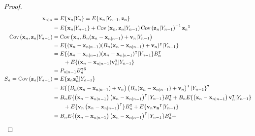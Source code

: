 \begin{proof}
    \begin{align}
        \mathbf{x}_{n|n}&=E\{\mathbf{x}_n|Y_n\}=E\{\mathbf{x}_n|Y_{n-1},\mathbf{z}_n\}\nonumber\\
                        &=E\{\mathbf{x}_n|Y_{n-1}\}+\text{Cov}\left(\mathbf{x}_n,\mathbf{z}_n|Y_{n-1}\right)\text{Cov}\left(\mathbf{z}_n|Y_{n-1}\right)^{-1}\mathbf{z}_n\footnotemark[5]\label{eq:xtGtTmp}\\
        \text{Cov}\left(\mathbf{x}_n,\mathbf{z}_n|Y_{n-1}\right)&=\text{Cov}\left(\mathbf{x}_n,B_n(\mathbf{x}_n-\mathbf{x}_{n|n-1})+\mathbf{v}_n|Y_{n-1}\right)\nonumber\\
                                                                &=E\{(\mathbf{x}_n-\mathbf{x}_{n|n-1})(B_n(\mathbf{x}_n-\mathbf{x}_{n|n-1})+\mathbf{v}_n)^\intercal|Y_{n-1}\}\nonumber\\
                                                                &=E\{(\mathbf{x}_n-\mathbf{x}_{n|n-1})(\mathbf{x}_n-\mathbf{x}_{n|n-1})^\intercal|Y_{n-1}\}B_n^\intercal\nonumber\\
                                                                &\qquad +E\{(\mathbf{x}_n-\mathbf{x}_{n|n-1})\mathbf{v}_n^\intercal|Y_{n-1}\}\nonumber\\
                                                                &=P_{n|n-1}B_n^\intercal\footnotemark[6]\label{eq:covXZ}\\
        S_n=\text{Cov}\left(\mathbf{z}_n|Y_{n-1}\right)&=E\{\mathbf{z}_n\mathbf{z}_n^\intercal|Y_{n-1}\}\nonumber\\
                                                       &=E\{\left(B_n(\mathbf{x}_n-\mathbf{x}_{n|n-1})+\mathbf{v}_n\right)\left(B_n(\mathbf{x}_n-\mathbf{x}_{n|n-1})+\mathbf{v}_n\right)^\intercal|Y_{n-1}\}\footnotemark[7]\nonumber\\
                                                       &=B_nE\{\left(\mathbf{x}_n-\mathbf{x}_{n|n-1}\right)\left(\mathbf{x}_n-\mathbf{x}_{n|n-1}\right)^\intercal|Y_{n-1}\}B_n^\intercal+B_nE\{\left(\mathbf{x}_n-\mathbf{x}_{n|n-1}\right)\mathbf{v}_n^\intercal|Y_{n-1}\}\nonumber\\
                                                       &\qquad +E\{\mathbf{v}_n\left(\mathbf{x}_n-\mathbf{x}_{n|n-1}\right)^\intercal\}B_n^\intercal+E\{\mathbf{v}_n\mathbf{v_n}^\intercal|Y_{n-1}\}\nonumber\\
                                                       &=B_nE\{\left(\mathbf{x}_n-\mathbf{x}_{n|n-1}\right)\left(\mathbf{x}_n-\mathbf{x}_{n|n-1}\right)^\intercal|Y_{n-1}\}B_n^\intercal+\nonumber\\

\end{align}
\end{proof}
